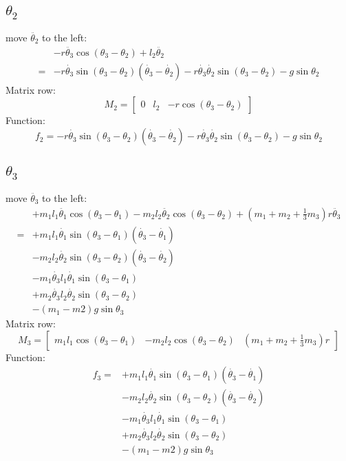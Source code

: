 \documentclass[titlepage]{article}
\numberwithin{equation}{section}
\begin{document}
\subsection{$\theta_2$}
move $\ddot{\theta_2}$ to the left:
\begin{align}
 &- r \ddot{\theta_3} \cos{(\theta_3 - \theta_2)} + l_2 \ddot{\theta_2} \nonumber \\
 = &- r \dot{\theta_3} \sin{(\theta_3 - \theta_2)} (\dot{\theta_3} - \dot{\theta_2}) - r \dot{\theta_3} \dot{\theta_2} \sin{(\theta_3 - \theta_2)}  - g \sin \theta_2
\end{align}
Matrix row:
\begin{equation}
M_2 = \begin{bmatrix}
      0 & l_2 & - r \cos{(\theta_3 - \theta_2)}
      \end{bmatrix}
\end{equation}
Function:
\begin{equation}
f_2 = - r \dot{\theta_3} \sin{(\theta_3 - \theta_2)} (\dot{\theta_3} - \dot{\theta_2}) - r \dot{\theta_3} \dot{\theta_2} \sin{(\theta_3 - \theta_2)}  - g \sin \theta_2
\end{equation}

\subsection{$\theta_3$}
move $\ddot{\theta_3}$ to the left:
\begin{align}
 &+ m_1 l_1 \ddot{\theta_1} \cos{(\theta_3 - \theta_1)} - m_2 l_2 \ddot{\theta_2} \cos{(\theta_3 - \theta_2)} + (m_1 + m_2 + \frac{1}{3} m_3) r \ddot{\theta_3} \nonumber \\
 = &+ m_1 l_1 \dot{\theta_1} \sin{(\theta_3 - \theta_1)} (\dot{\theta_3} - \dot{\theta_1}) \nonumber \\
 &- m_2 l_2 \dot{\theta_2} \sin{(\theta_3 - \theta_2)} (\dot{\theta_3} - \dot{\theta_2}) \nonumber \\
 &- m_1 \dot{\theta_3} l_1 \dot{\theta_1} \sin{(\theta_3 - \theta_1)} \nonumber \\
 &+ m_2 \dot{\theta_3} l_2 \dot{\theta_2} \sin{(\theta_3 - \theta_2)} \nonumber \\
 &- (m_1 - m2) g \sin \theta_3
\end{align}
Matrix row:
\begin{equation}
M_3 = \begin{bmatrix}
      m_1 l_1 \cos{(\theta_3 - \theta_1)} & - m_2 l_2 \cos{(\theta_3 - \theta_2)} & (m_1 + m_2 + \frac{1}{3} m_3) r
      \end{bmatrix}
\end{equation}
Function:
\begin{align}
f_3 = &+ m_1 l_1 \dot{\theta_1} \sin{(\theta_3 - \theta_1)} (\dot{\theta_3} - \dot{\theta_1}) \nonumber \\
 &- m_2 l_2 \dot{\theta_2} \sin{(\theta_3 - \theta_2)} (\dot{\theta_3} - \dot{\theta_2}) \nonumber \\
 &- m_1 \dot{\theta_3} l_1 \dot{\theta_1} \sin{(\theta_3 - \theta_1)} \nonumber \\
 &+ m_2 \dot{\theta_3} l_2 \dot{\theta_2} \sin{(\theta_3 - \theta_2)} \nonumber \\
 &- (m_1 - m2) g \sin \theta_3
\end{align}
\end{document}
